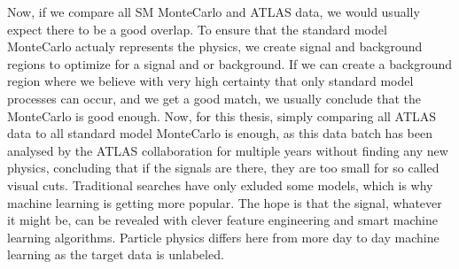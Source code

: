 Now, if we compare all SM MonteCarlo and ATLAS data, we would usually expect there to be a good overlap. To ensure that the standard model 
MonteCarlo actualy represents the physics, we create signal and background regions to optimize for a signal and or background. If we can 
create a background region where we believe with very high certainty that only standard model processes can occur, and we get a good match, 
we usually conclude that the MonteCarlo is good enough. Now, for this thesis, simply comparing all ATLAS data to all standard model MonteCarlo
is enough, as this data batch has been analysed by the ATLAS collaboration for multiple years without finding any new physics, concluding 
that if the signals are there, they are too small for so called visual cuts. Traditional searches have only exluded some models, which is why 
machine learning is getting more popular. The hope is that the signal, whatever it might be, can be revealed with clever feature 
engineering and smart machine learning algorithms. Particle physics differs here from more day to day machine learning as the target data is 
unlabeled. 


